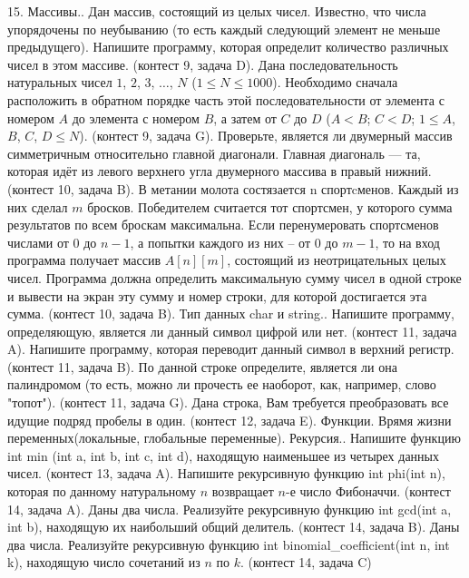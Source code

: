 \documentclass[a4paper,12pt]{article}
\begin{document}
15. Массивы.. Дан массив, состоящий из целых чисел. Известно, что числа упорядочены по неубыванию (то есть каждый следующий элемент не меньше предыдущего). Напишите программу, которая определит количество различных чисел в этом массиве. (контест 9, задача D). Дана последовательность натуральных чисел $1$, $2$, $3$, $\dots$, $N$ ($1 \le N \le 1000$). Необходимо сначала расположить в обратном порядке часть этой последовательности от элемента с номером $A$ до элемента с номером $B$, а затем от $C$ до $D$ ($A < B$; $C < D$; $1 \le A$, $B$, $C$, $D \le N$). (контест 9, задача G). Проверьте, является ли двумерный массив симметричным относительно главной диагонали. Главная диагональ — та, которая идёт из левого верхнего угла двумерного массива в правый нижний. (контест 10, задача B). В метании молота состязается n спортcменов. Каждый из них сделал $m$ бросков. Победителем считается тот спортсмен, у которого сумма результатов по всем броскам максимальна. Если перенумеровать спортсменов числами от $0$ до $n-1$, а попытки каждого из них – от $0$ до $m-1$, то на вход программа получает массив $A[n][m]$, состоящий из неотрицательных целых чисел. Программа должна определить максимальную сумму чисел в одной строке и вывести на экран эту сумму и номер строки, для которой достигается эта сумма. (контест 10, задача B). Тип данных char и string.. Напишите программу, определяющую, является ли данный символ цифрой или нет. (контест 11, задача A). Напишите программу, которая переводит данный символ в верхний регистр. (контест 11, задача B). По данной строке определите, является ли она палиндромом (то есть, можно ли прочесть ее наоборот, как, например, слово "топот"). (контест 11, задача G). Дана строка, Вам требуется преобразовать все идущие подряд пробелы в один. (контест 12, задача E). Функции. Врямя жизни переменных(локальные, глобальные переменные). Рекурсия.. Напишите функцию int min (int a, int b, int c, int d), находящую наименьшее из четырех данных чисел. (контест 13, задача A). Напишите рекурсивную функцию int phi(int n), которая по данному натуральному $n$ возвращает $n$-е число Фибоначчи. (контест 14, задача A). Даны два числа. Реализуйте рекурсивную функцию int gcd(int a, int b), находящую их наибольший общий делитель. (контест 14, задача B). Даны два числа. Реализуйте рекурсивную функцию int binomial\_coefficient(int n, int k), находящую число сочетаний из $n$ по $k$. (контест 14, задача C)
\end{document}

